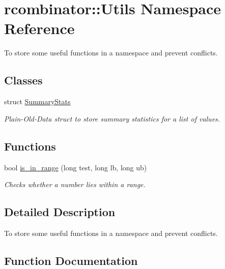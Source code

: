 \hypertarget{namespacercombinator_1_1Utils}{}\section{rcombinator\+:\+:Utils Namespace Reference}
\label{namespacercombinator_1_1Utils}


To store some useful functions in a namespace and prevent conflicts.  


\subsection*{Classes}
\begin{DoxyCompactItemize}
\item 
struct \mbox{\hyperlink{structrcombinator_1_1Utils_1_1SummaryStats}{Summary\+Stats}}
\begin{DoxyCompactList}\small\item\em Plain-\/\+Old-\/\+Data struct to store summary statistics for a list of values. \end{DoxyCompactList}\end{DoxyCompactItemize}
\subsection*{Functions}
\begin{DoxyCompactItemize}
\item 
bool \mbox{\hyperlink{namespacercombinator_1_1Utils_aa38fa31292dbf3a06522dc76b20e2572}{is\+\_\+in\+\_\+range}} (long test, long lb, long ub)
\begin{DoxyCompactList}\small\item\em Checks whether a number lies within a range. \end{DoxyCompactList}\end{DoxyCompactItemize}


\subsection{Detailed Description}
To store some useful functions in a namespace and prevent conflicts. 

\subsection{Function Documentation}
\mbox{\label{namespacercombinator_1_1Utils_aa38fa31292dbf3a06522dc76b20e2572}} 
